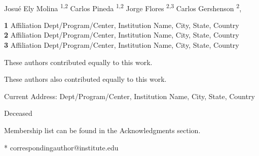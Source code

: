 \documentclass[10pt,letterpaper]{article} %
\begin{document}
\vspace*{0.2in}

\begin{flushleft}
{\Large
\textbf{} %
}
\newline
\\

Josué Ely Molina  \textsuperscript{1,2} %
Carlos Pineda     \textsuperscript{1,2}    %
Jorge Flores      \dag \textsuperscript{2,3} %
Carlos Gershenson \textsuperscript{2},

\bigskip
\textbf{1} Affiliation Dept/Program/Center, Institution Name, City, State, Country
\\
\textbf{2} Affiliation Dept/Program/Center, Institution Name, City, State, Country
\\
\textbf{3} Affiliation Dept/Program/Center, Institution Name, City, State, Country
\\
\bigskip

% 
%
\Yinyang These authors contributed equally to this work.

\ddag These authors also contributed equally to this work.

\textcurrency Current Address: Dept/Program/Center, Institution Name, City, State, Country %

\dag Deceased

\textpilcrow Membership list can be found in the Acknowledgments section.

* correspondingauthor@institute.edu

\end{flushleft}
\end{document}

